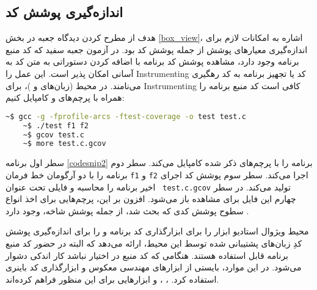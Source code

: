      
  \subsection{اندازه‌گیری پوشش کد}\label{sec:instrumenting}
   هدف از مطرح کردن دیدگاه جعبه در بخش \ref{box_view}، اشاره به امکانات لازم برای اندازه‌گیری معیارهای پوشش از جمله پوشش کد بود. در آزمون جعبه سفید که کد منبع برنامه وجود دارد، مشاهده پوشش کد برنامه با اضافه کردن دستوراتی به متن کد به آسانی امکان پذیر است. این عمل را \gls{Instrumenting} کد یا تجهیز برنامه به کد رهگیری می‌نامند\cite{Rathaus:2007:OSF:1536880}. در محیط  (زبان‌های  و )، برای \gls{Instrumenting} کافی است کد منبع برنامه را همراه با پرچم‌های
   و
   کامپایل کنیم:\\
   
   
   \begin{LTR}
   	\begin{lstlisting}[language=bash, caption={\rl{ابزارگذاری کد در محیط \lr{GNU/GCC}.}}, label={codesnip2}]
   	~$ gcc -g -fprofile-arcs -ftest-coverage -o test test.c
   	~$ ./test f1 f2
   	~$ gcov test.c
   	~$ more test.c.gcov\end{lstlisting}
   \end{LTR}
سطر اول برنامه \ref{codesnip2} برنامه  را با پرچم‌های ذکر شده کامپایل می‌کند. سطر دوم برنامه را با دو آرگومان خط فرمان \texttt{f1} و \texttt{f2} اجرا می‌کند. سطر سوم پوشش کد اجرای اخیر برنامه را محاسبه و فایلی تحت عنوان \texttt{ test.c.gcov} تولید می‌کند. در سطر چهارم این فایل برای مشاهده باز می‌شود. افزون بر این، پرچم‌هایی برای اخذ انواع سطوح پوشش کدی که بحث شد، از جمله پوشش شاخه، وجود دارد \cite{Rathaus:2007:OSF:1536880}. 

  محیط ویژوال استادیو ابزار  را برای ابزارگذاری کد برنامه و  را برای اندازه‌گیری پوشش کدِ زبان‌های پشتیبانی شده توسط این محیط، ارائه می‌دهد که البته در حضور کد منبع برنامه قابل استفاده هستند. هنگامی که کد منبع در اختیار نباشد کار اندکی دشوار می‌شود. در این موارد، بایستی از ابزارهای مهندسی معکوس و ابزارگذاری کد باینری استفاده کرد.
 \cite{Bruening:2004:ETC:1087758}،
 \cite{Luk:2005:PBC:1064978.1065034}،
 \cite{Rathaus:2007:OSF:1536880}
  و 
   \cite{QEMU2018}
 ابزارهایی برای این منظور فراهم کرده‌اند.


